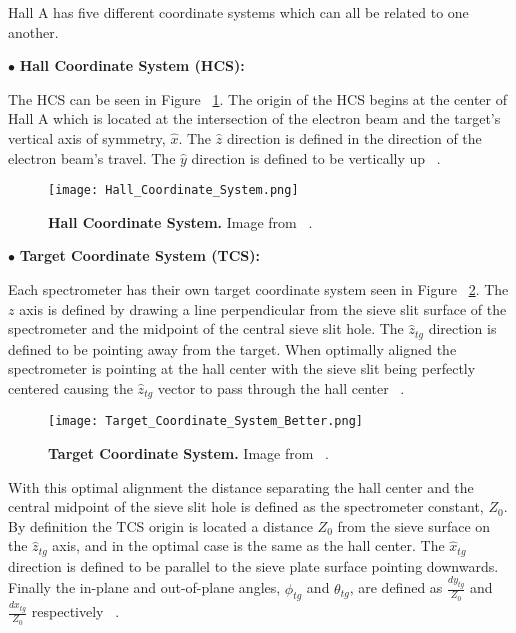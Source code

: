 Hall A has five different coordinate systems which can all be related to one another. 

\noindent $\bullet$ \textbf{Hall Coordinate System (HCS):}

The HCS can be seen in Figure ~\ref{fig:hcs}. The origin of the HCS begins at the center of Hall A which is located at the intersection of the electron beam and the target's vertical axis of symmetry, $\hat{x}$. The $\hat{z}$ direction is defined in the direction of the electron beam's travel. The $\hat{y}$ direction is defined to be vertically up ~\cite{optics}.

\begin{figure}[!ht]
\begin{center}
\texttt{[image: Hall\_Coordinate\_System.png]}
\end{center}
\caption[Hall Coordinate System]{
{\bf{Hall Coordinate System.}} Image from ~\cite{optics}.}
\label{fig:hcs}
\end{figure}

\noindent $\bullet$ \textbf{Target Coordinate System (TCS):}

Each spectrometer has their own target coordinate system seen in Figure ~\ref{fig:tcs}. The $z$ axis is defined by drawing a line perpendicular from the sieve slit surface of the spectrometer and the midpoint of the central sieve slit hole. The $\hat{z}_{tg}$ direction is defined to be pointing away from the target. When optimally aligned the spectrometer is pointing at the hall center with the sieve slit being perfectly centered causing the $\hat{z}_{tg}$ vector to pass through the hall center ~\cite{optics}. 

\begin{figure}[!ht]
\begin{center}
\texttt{[image: Target\_Coordinate\_System\_Better.png]}
\end{center}
\caption[Target Coordinate System]{
{\bf{Target Coordinate System.}} Image from ~\cite{Thesis:Ye}.}
\label{fig:tcs}
\end{figure}

With this optimal alignment the distance separating the hall center and the central midpoint of the sieve slit hole is defined as the spectrometer constant, $Z_0$. By definition the TCS origin is located a distance $Z_0$ from the sieve surface on the $\hat{z}_{tg}$ axis, and in the optimal case is the same as the hall center. The  $\hat{x}_{tg}$ direction is defined to be parallel to the sieve plate surface pointing downwards. Finally the in-plane and out-of-plane angles, $\phi_{tg}$ and $\theta_{tg}$, are defined as $\frac{dy_{tg}}{Z_0}$ and $\frac{dx_{tg}}{Z_0}$ respectively ~\cite{optics}.

